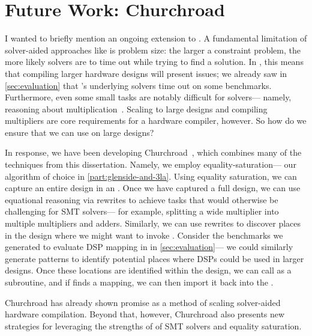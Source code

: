 \chapter{Future Work: Churchroad}
\label{chapter:churchroad}

I wanted to briefly mention
  an ongoing extension to \lr.
A fundamental limitation
  of solver-aided approaches
  like \lr
  is problem size:
  the larger a constraint problem,
  the more likely solvers are to time out
  while trying to find a solution.
In \lr, this means that
  compiling larger hardware designs
  will present issues;
  we already saw in \cref{sec:evaluation}
  that \lr's underlying solvers
  time out
  on some benchmarks.
Furthermore, even some small tasks
  are 
  notably difficult for solvers---%
  namely, reasoning about multiplication~\cite{rath2024polysat,brain2021further}.
Scaling to large designs
  and compiling multipliers
  are core requirements
  for a hardware compiler,
  however.
So how do we ensure that
  we can use \lr
  on large designs?

In response,
  we have been developing Churchroad~\cite[section 4]{smith2024there},
  which combines many of the techniques from this dissertation.
Namely, we employ
  \gls{equality-saturation}---%
  our algorithm of choice in \cref{part:glenside-and-3la}.
Using equality saturation,
  we can capture an entire design
  in an \egr.
Once we have captured a full design, we can
  use equational reasoning via rewrites
  to achieve tasks that
  would otherwise be challenging
  for SMT solvers---%
  for example, splitting a wide
  multiplier
  into multiple multipliers and adders.
Similarly, we can use rewrites
  to discover places in the design
  where we might want to invoke \lr.
Consider the benchmarks
  we generated to evaluate DSP mapping in
  in \cref{sec:evaluation}---%
  we could similarly generate patterns
  to identify potential places where DSPs could be used
  in larger designs.
Once these locations are identified within the design,
  we can call \lr as a subroutine,
  and if \lr finds a mapping,
  we can then import it back into the \egr.

Churchroad has already shown promise as a method
  of scaling solver-aided hardware compilation.
Beyond that, however,
  Churchroad also presents new strategies
  for leveraging the strengths of
  of SMT solvers and equality saturation.